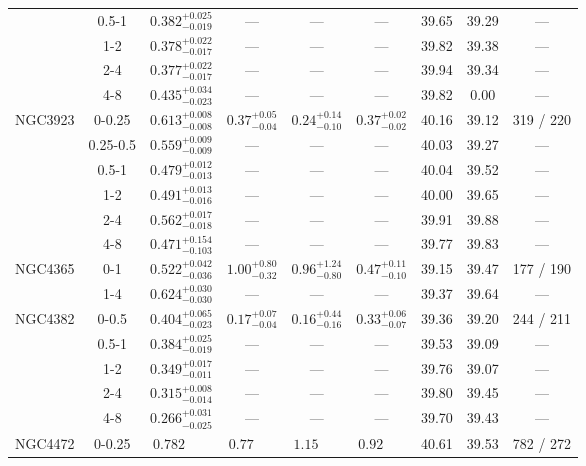 \documentclass[structabstract]{aa}
\begin{document}
{{\begin{longtable}{lcccccccc}
 & 0.5-1 & $ 0.382 _{- 0.019 }^{+ 0.025 } $ & --- & --- & --- &  39.65 & 39.29 & --- \\
 & 1-2 & $ 0.378 _{- 0.017 }^{+ 0.022 } $ & --- & --- & --- &  39.82 &  39.38 & --- \\
 & 2-4 & $ 0.377 _{- 0.017 }^{+ 0.022 } $ & --- & --- & --- &  39.94 &  39.34 & --- \\
 & 4-8 & $ 0.435 _{- 0.023 }^{+ 0.034 } $ & --- & --- & --- &  39.82 &   0.00 & --- \\
\hline
NGC3923 & 0-0.25 & $ 0.613 _{- 0.008 }^{+ 0.008 } $ & $  0.37 _{-  0.04 }^{+  0.05 } $ & $  0.24 _{-  0.10 }^{+  0.14 } $ & $  0.37 _{-  0.02 }^{+  0.02 } $ &  40.16 & 39.12 &   319 /   220 \\
 & 0.25-0.5 & $ 0.559 _{- 0.009 }^{+ 0.009 } $ & --- & --- & --- &  40.03 & 39.27 & --- \\
 & 0.5-1 & $ 0.479 _{- 0.013 }^{+ 0.012 } $ & --- & --- & --- &  40.04 & 39.52 & --- \\
 & 1-2 & $ 0.491 _{- 0.016 }^{+ 0.013 } $ & --- & --- & --- &  40.00 & 39.65 & --- \\
 & 2-4 & $ 0.562 _{- 0.018 }^{+ 0.017 } $ & --- & --- & --- &  39.91 & 39.88 & --- \\
 & 4-8 & $ 0.471 _{- 0.103 }^{+ 0.154 } $ & --- & --- & --- &  39.77 & 39.83 & --- \\
\hline
NGC4365 & 0-1 & $ 0.522 _{- 0.036 }^{+ 0.042 } $ & $  1.00 _{-  0.32 }^{+  0.80 } $ & $  0.96 _{-  0.80 }^{+  1.24 } $ & $  0.47 _{-  0.10 }^{+  0.11 } $ &  39.15 & 39.47 &   177 /   190 \\
 & 1-4 & $ 0.624 _{- 0.030 }^{+ 0.030 } $ & --- & --- & --- &  39.37 & 39.64 & --- \\
\hline
NGC4382 & 0-0.5 & $ 0.404 _{- 0.023 }^{+ 0.065 } $ & $  0.17 _{-  0.04 }^{+  0.07 } $ & $  0.16 _{-  0.16 }^{+  0.44 } $ & $  0.33 _{-  0.07 }^{+  0.06 } $ &  39.36 & 39.20  &   244 /   211 \\
 & 0.5-1 & $ 0.384 _{- 0.019 }^{+ 0.025 } $ & --- & --- & --- &  39.53 & 39.09 & --- \\
 & 1-2 & $ 0.349 _{- 0.011 }^{+ 0.017 } $ & --- & --- & --- &  39.76 & 39.07 & --- \\
 & 2-4 & $ 0.315 _{- 0.014 }^{+ 0.008 } $ & --- & --- & --- &  39.80 & 39.45 & --- \\
 & 4-8 & $ 0.266 _{- 0.025 }^{+ 0.031 } $ & --- & --- & --- &  39.70 & 39.43 & --- \\
\hline
NGC4472 & 0-0.25 & $ 0.782~~~~~~~~ $ & $  0.77~~~~~~~ $ & $  1.15~~~~~~~ $ & $  0.92~~~~~~~ $ &  40.61 &  39.53&   782 /   272 \\

\end{longtable}}}
\end{document}
